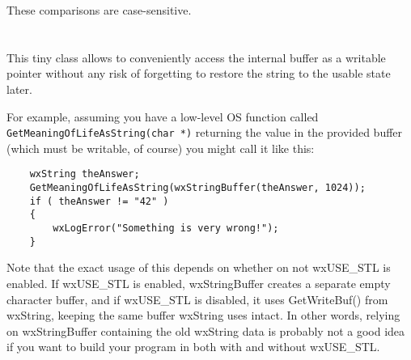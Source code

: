 











These comparisons are case-sensitive.


\section{}\label{wxstringbuffer}

This tiny class allows to conveniently access the  
internal buffer as a writable pointer without any risk of forgetting to restore
the string to the usable state later.

For example, assuming you have a low-level OS function called 
{\tt GetMeaningOfLifeAsString(char *)} returning the value in the provided
buffer (which must be writable, of course) you might call it like this:

\begin{verbatim}
    wxString theAnswer;
    GetMeaningOfLifeAsString(wxStringBuffer(theAnswer, 1024));
    if ( theAnswer != "42" )
    {
        wxLogError("Something is very wrong!");
    }
\end{verbatim}

Note that the exact usage of this depends on whether on not wxUSE\_STL is enabled.  If
wxUSE\_STL is enabled, wxStringBuffer creates a separate empty character buffer, and
if wxUSE\_STL is disabled, it uses GetWriteBuf() from wxString, keeping the same buffer
wxString uses intact.  In other words, relying on wxStringBuffer containing the old 
wxString data is probably not a good idea if you want to build your program in both
with and without wxUSE\_STL.

